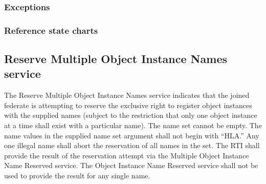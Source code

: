 \begin{compactstdpage}

    \subsubsection{Exceptions}



    \subsubsection{Reference state charts}



    \subsection{Reserve Multiple Object Instance Names service}


    The Reserve Multiple Object Instance Names service indicates that the joined federate is attempting to reserve the exclusive right to register object instances with the supplied names (subject to the restriction that only one object instance at a time shall exist with a particular name). The name set cannot be empty. The name values in the supplied name set argument shall not begin with ``HLA.'' Any one illegal name shall abort the reservation of all names in the set. The RTI shall provide the result of the reservation attempt via the Multiple Object Instance Name Reserved \rtiinitiated{} service. The Object Instance Name Reserved \rtiinitiated{} service shall not be used to provide the result for any single name.

\end{compactstdpage}

\clearpage

